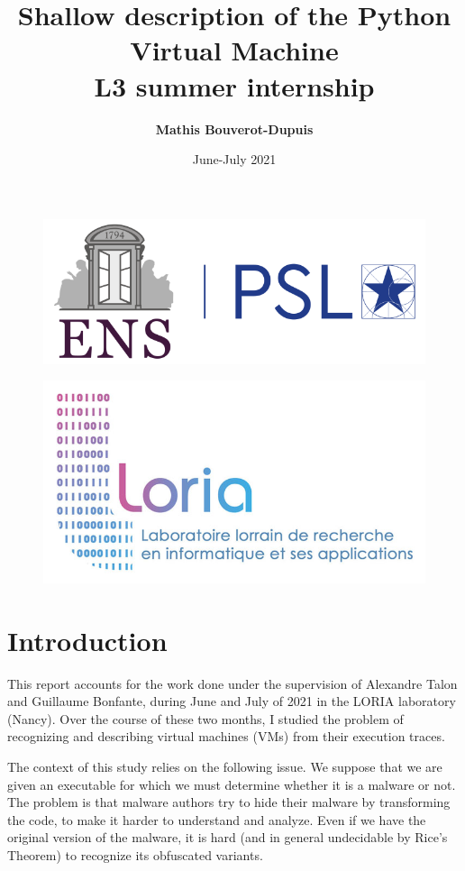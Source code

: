 \documentclass[english]{article}
\begin{document}
	
\title{{\huge \bf Shallow description of the Python Virtual Machine} \large  \\ 
	\medskip 
	L3 summer internship}
\author{\bf \Large Mathis Bouverot-Dupuis}
\date{June-July 2021}

\maketitle 

\begin{figure}[h]
	\centering 
	\includegraphics[width=.7\linewidth]{img/logoENS.png}	
\end{figure}
\begin{figure}[h]
	\centering 
	\includegraphics[width=.7\linewidth]{img/logoLORIA.jpg}
\end{figure} 

\newpage 

\tableofcontents

\section{Introduction}
This report accounts for the work done under the supervision of Alexandre Talon and Guillaume Bonfante, during June and July of 2021 in the LORIA laboratory (Nancy). Over the course of these two months, I studied the problem of recognizing and describing virtual machines (VMs) from their execution traces.

The context of this study relies on the following issue. We suppose that we are given an executable for which we must determine whether it is a malware or not. The problem is that malware authors try to hide their malware by transforming the code, to make it harder to understand and analyze. Even if we have the original version of the malware, it is hard (and in general undecidable by Rice's Theorem) to recognize its obfuscated variants.
\end{document}
